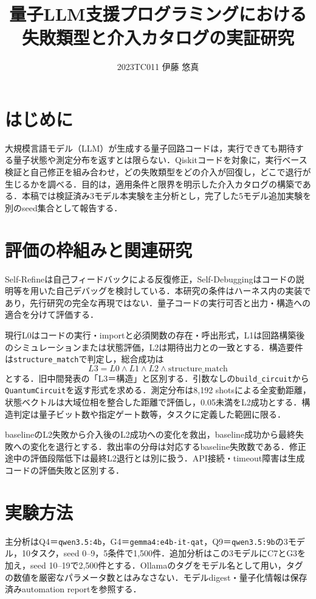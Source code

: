 \documentclass[a4paper,8pt,twocolumn]{extarticle}
\title{量子LLM支援プログラミングにおける\\失敗類型と介入カタログの実証研究}
\author{2023TC011 伊藤 悠真}
\affiliation{指導教員：横山 哲郎}
\begin{document}
\maketitle
\thispagestyle{empty}

\section{はじめに}
大規模言語モデル（LLM）が生成する量子回路コードは，実行できても期待する量子状態や測定分布を返すとは限らない．Qiskitコードを対象に，実行ベース検証と自己修正を組み合わせ，どの失敗類型をどの介入が回復し，どこで退行が生じるかを調べる．目的は，適用条件と限界を明示した介入カタログの構築である．本稿では検証済み3モデル本実験を主分析とし，完了した5モデル追加実験を別のseed集合として報告する．

\section{評価の枠組みと関連研究}
Self-Refineは自己フィードバックによる反復修正\cite{selfrefine}，Self-Debuggingはコードの説明等を用いた自己デバッグ\cite{selfdebug}を検討している．本研究の条件はハーネス内の実装であり，先行研究の完全な再現ではない．量子コードの実行可否と出力・構造への適合を分けて評価する．

現行L0はコードの実行・importと必須関数の存在・呼出形式，L1は回路構築後のシミュレーションまたは状態評価，L2は期待出力との一致とする．構造要件は\texttt{structure\_match}で判定し，総合成功は
\begin{equation}
L3=L0\land L1\land L2\land\mathrm{structure\_match}
\end{equation}
とする．旧中間発表の「L3＝構造」と区別する．引数なしの\texttt{build\_circuit}から\texttt{QuantumCircuit}を返す形式を求める．測定分布は8,192 shotsによる全変動距離，状態ベクトルは大域位相を整合した距離で評価し，0.05未満をL2成功とする．構造判定は量子ビット数や指定ゲート数等，タスクに定義した範囲に限る．

baselineのL2失敗から介入後のL2成功への変化を救出，baseline成功から最終失敗への変化を退行とする．救出率の分母は対応するbaseline失敗数である．修正途中の評価段階低下は最終L2退行とは別に扱う．API接続・timeout障害は生成コードの評価失敗と区別する．

\section{実験方法}
主分析はQ4＝\texttt{qwen3.5:4b}，G4＝\texttt{gemma4:e4b-it-qat}，Q9＝\texttt{qwen3.5:9b}の3モデル，10タスク，seed 0--9，5条件で1,500件．追加分析はこの3モデルにC7とG3を加え，seed 10--19で2,500件とする．Ollamaのタグをモデル名として用い，タグの数値を厳密なパラメータ数とはみなさない．モデルdigest・量子化情報は保存済みautomation reportを参照する．
\end{document}
